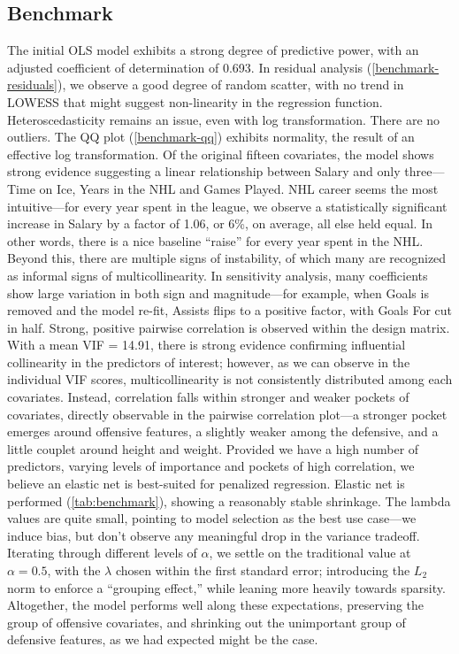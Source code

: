 \documentclass[10pt]{article}
\begin{document}
\subsection{Benchmark}
The initial OLS model %
exhibits a strong degree of predictive power, with an adjusted coefficient of determination of 0.693. In residual analysis (\autoref{benchmark-residuals}), we observe a good degree of random scatter, with no trend in LOWESS that might suggest non-linearity in the regression function. Heteroscedasticity remains an issue, even with log transformation. There are no outliers. The QQ plot (\autoref{benchmark-qq}) exhibits normality, the result of an effective log transformation. Of the original fifteen covariates, the model shows strong evidence suggesting a linear relationship between Salary and only three—Time on Ice, Years in the NHL and Games Played. NHL career seems the most intuitive—for every year spent in the league, we observe a statistically significant increase in Salary by a factor of 1.06, or 6\%, on average, all else held equal. 
 In other words, there is a nice baseline “raise” for every year spent in the NHL. Beyond this, there are multiple signs of instability, of which many are recognized as informal signs of multicollinearity. In sensitivity analysis, many coefficients show large variation in both sign and magnitude—for example, when Goals is removed and the model re-fit, Assists flips to a positive factor, with Goals For cut in half. Strong, positive pairwise correlation is observed within the design matrix.
With a mean VIF = 14.91, there is strong evidence confirming influential collinearity in the predictors of interest; however, as we can observe in the individual VIF scores, multicollinearity is not consistently distributed among each covariates. Instead, correlation falls within stronger and weaker pockets of covariates, directly observable in the pairwise correlation plot—a stronger pocket emerges around offensive features, a slightly weaker among the defensive, and a little couplet around height and weight. Provided we have a high number of predictors, varying levels of importance and pockets of high correlation, we believe an elastic net is best-suited for penalized regression.
Elastic net is performed (\autoref{tab:benchmark}), showing a reasonably stable shrinkage. The lambda values are quite small, pointing to model selection as the best use case—we induce bias, but don’t observe any meaningful drop in the variance tradeoff. Iterating through different levels of $\alpha$, we settle on the traditional value at $\alpha = 0.5$, with the $\lambda$ chosen within the first standard error; introducing the $L_2$ norm to enforce a “grouping effect,” while leaning more heavily towards sparsity. Altogether, the model performs well along these expectations, preserving the group of offensive covariates, and shrinking out the unimportant group of defensive features, as we had expected might be the case. 
\end{document}
